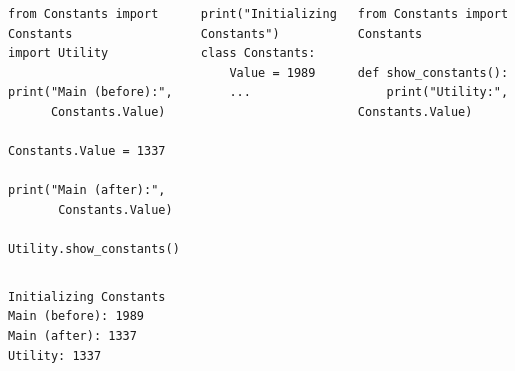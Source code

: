 
\begin{frame}[fragile]
%
\vspace{-6pt}
\begin{columns}[T]
\begin{codebox}
\begin{verbatim}
from Constants import Constants
import Utility

print("Main (before):",
      Constants.Value)

Constants.Value = 1337

print("Main (after):",
       Constants.Value)

Utility.show_constants()
\end{verbatim}
\end{codebox}
%
\begin{codebox}
\begin{verbatim}
print("Initializing Constants")
class Constants:
    Value = 1989
    ...
\end{verbatim}
\end{codebox}
%
\vspace{-3pt}
\begin{codebox}
\begin{verbatim}
from Constants import Constants

def show_constants():
    print("Utility:", Constants.Value)
\end{verbatim}
\end{codebox}
\end{columns}
%
\begin{cmdbox}[Output]
\begin{verbatim}
Initializing Constants
Main (before): 1989
Main (after): 1337
Utility: 1337
\end{verbatim}
\end{cmdbox}
%
\end{frame}


